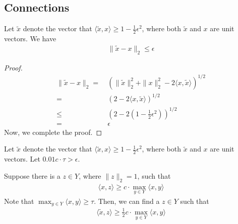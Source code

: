 \subsection{Connections}
\begin{fact}\label{fac:x_x_eps}
Let $\widetilde{x}$ denote the vector that $\langle \widetilde{x}, x \rangle \geq 1-\frac{1}{2}\epsilon^2$, where both $\widetilde{x}$ and $x$ are unit vectors. We have
    \begin{align*}
        \| \widetilde{x} - x \|_2 \leq \epsilon
    \end{align*}
\end{fact}
\begin{proof}
    \begin{align*}
        \| \widetilde{x} - x \|_2 = &~ (\| \widetilde{x}\|_2^2 + \|x\|_2^2 - 2 \langle x,\widetilde{x} \rangle )^{1/2}\\
        = &~ (2 - 2\langle x,\widetilde{x} \rangle)^{1/2} \\
        \leq &~ (2 - 2(1-\frac{1}{2}\epsilon^2))^{1/2}\\
        = &~ \epsilon
    \end{align*}
    Now, we complete the proof.
\end{proof}
\begin{lemma}%
Let $\widetilde{x}$ denote the vector that $\langle \widetilde{x}, x \rangle \geq 1-\frac{1}{2}\epsilon^2$, where both $\widetilde{x}$ and $x$ are unit vectors. Let $0.01 c \cdot \tau > \epsilon$. 

Suppose there is a $z \in Y$, where $\|z\|_2 = 1$, such that
\begin{align*}
\langle x, z \rangle \geq c \cdot \max_{y \in Y} \langle x , y \rangle
\end{align*}
Note that $\max_{y \in Y}\langle x , y \rangle \geq \tau$.
Then, we can find a $z \in Y$ such that 
\begin{align*}
\langle \widetilde{x}, z \rangle \geq \frac{1}{2} c  \cdot \max_{y \in Y} \langle x , y \rangle
\end{align*}
\end{lemma}
